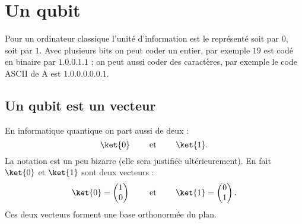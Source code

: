 \documentclass[11pt,class=report,crop=false]{standalone}
\begin{document}





\section{Un qubit}

Pour un ordinateur classique l'unité d'information est le  représenté soit par $0$, soit par 
$1$. Avec plusieurs bits on peut coder un entier, par exemple $19$ est codé en binaire par $1.0.0.1.1$ ; on peut aussi coder des caractères, par exemple le code ASCII de \og{}A\fg{} est $1.0.0.0.0.0.1$.

\subsection{Un qubit est un vecteur}

En informatique quantique on part aussi de deux  :
$$\ket{0} \qquad \text{ et } \qquad \ket{1}.$$
La notation est un peu bizarre (elle sera justifiée ultérieurement).
En fait $\ket{0}$ et $\ket{1}$ sont deux vecteurs :
$$\ket{0} = \begin{pmatrix}1\\0\end{pmatrix} \qquad \text{ et } \qquad \ket{1} = \begin{pmatrix}0\\1\end{pmatrix}.$$
Ces deux vecteurs forment une base orthonormée du plan.

\end{document}
